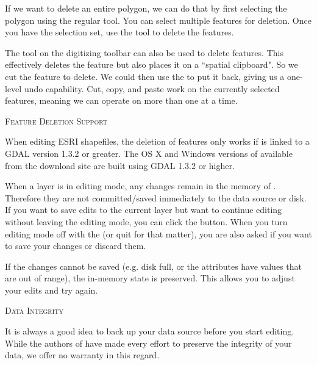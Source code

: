 
If we want to delete an entire polygon, we can do that by first selecting
the polygon using the regular  tool. You can select
multiple features for deletion. Once you have the selection set, use the
 tool to delete the features.

The  tool on the digitizing toolbar can
also be used to delete features. This effectively deletes the feature but
also places it on a ``spatial clipboard". So we cut the feature to delete.
We could then use the  to put it back, giving us a one-level undo
capability. Cut, copy, and paste work on the currently selected features,
meaning we can operate on more than one at a time.

\begin{Tip}\caption{\textsc{Feature Deletion Support}}
When editing ESRI shapefiles, the deletion
of features only works if \qg is linked to a GDAL version 1.3.2 or greater.
The OS X and Windows versions of \qg available from the download site are built
using GDAL 1.3.2 or higher.
\end{Tip}


When a layer is in editing mode, any changes remain in the memory of \qg.
Therefore they are not committed/saved immediately to the data source or disk.
If you want to save edits to the current layer but want to continue editing
without leaving the editing mode, you can click the
 button. When you turn editing mode
off with the  (or quit
\qg for that matter), you are also asked if you want to save your changes
or discard them.

If the changes cannot be saved (e.g. disk full, or the attributes have
values that are out of range), the \qg in-memory state is preserved.  This
allows you to adjust your edits and try again.

\begin{Tip}\caption{\textsc{Data Integrity}}
It is always a good idea to back up your data source before you
start editing. While the authors of \qg have made every effort to preserve the
integrity of your data, we offer no warranty in this regard.
\end{Tip}

